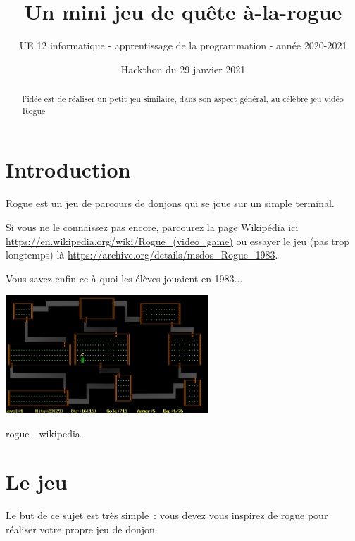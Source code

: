 \documentclass{article}
\begin{document}
\title{Un mini jeu de quête à-la-rogue}

\date{Hackthon du 29 janvier 2021}

\author{UE 12 informatique - apprentissage de la programmation - année
  2020-2021}

\maketitle

\begin{abstract}
l'idée est de réaliser un petit jeu similaire, dans son aspect
général, au célèbre jeu vidéo Rogue
\end{abstract}

\section{Introduction}

Rogue est un jeu de parcours de donjons qui se joue sur un simple
terminal.

Si vous ne le connaissez pas encore, parcourez la page Wikipédia ici
\url{https://en.wikipedia.org/wiki/Rogue\_(video\_game)} ou essayer le
jeu (pas trop longtemps) là
\url{https://archive.org/details/msdos\_Rogue\_1983}.

Vous savez enfin ce à quoi les élèves jouaient en 1983...

\vspace{.2cm}
\begin{center}
  \includegraphics[width=3.0in]{Rogue_Screen_Shot_CAR.png}
  
  rogue - wikipedia
\end{center}

\section{Le jeu}

Le but de ce sujet est très simple~: vous devez vous inspirez de rogue
pour réaliser votre propre jeu de donjon.
\end{document}
